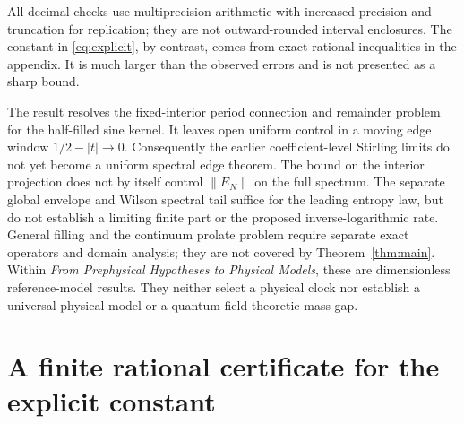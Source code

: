 \documentclass[10pt]{article}
\begin{document}
All decimal checks use multiprecision arithmetic with increased
precision and truncation for replication; they are not outward-rounded
interval enclosures. The constant in \eqref{eq:explicit}, by contrast,
comes from exact rational inequalities in the appendix. It is much
larger than the observed errors and is not presented as a sharp bound.

The result resolves the fixed-interior period connection and
remainder problem for the half-filled sine kernel. It leaves open
uniform control in a moving edge window $1/2-|t|\to0$.
Consequently the earlier coefficient-level Stirling limits do not
yet become a uniform spectral edge theorem. The bound on the
interior projection does not by itself control $\|E_N\|$ on the full
spectrum. The separate global envelope and Wilson spectral tail
suffice for the leading entropy law, but do not establish a limiting
finite part or the proposed inverse-logarithmic rate.
General filling and the continuum prolate problem require separate
exact operators and domain analysis; they are not covered by
Theorem~\ref{thm:main}. Within \emph{From Prephysical Hypotheses to
Physical Models}, these are dimensionless reference-model results.
They neither select a physical clock nor establish a universal
physical model or a quantum-field-theoretic mass gap.

\appendix
\section{A finite rational certificate for the explicit constant}
\end{document}
